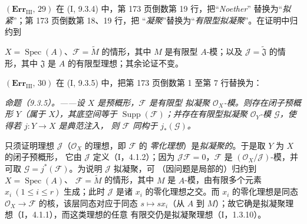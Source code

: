 \documentclass[UTF8,fontset=none,11pt,oneside,openany]{ctexbook}
\newcommand{\oldpage}[2][]{%
  \hypertarget{ega-source-page-#1-#2}{}%
  \marginnote{\scriptsize\textbf{#1}~|~#2}\ignorespaces}
\begin{document}
\noindent\textbf{$(\mathbf{Err}_{\mathrm{III}},\,29)$} 在
(I, 9.3.4) 中，第 173 页倒数第 19 行，把“\emph{Noether}”
替换为“\emph{拟紧}”；第 173 页倒数第 18、19 行，把
“\emph{凝聚}”替换为“\emph{有限型拟凝聚}”。在证明中归约到

\oldpage[III]{223}
$X=\operatorname{Spec}(A)$、$\mathscr F=\widetilde M$ 的情形，其中
$M$ 是有限型 $A$-模；以及 $\mathscr J=\widetilde{\mathfrak J}$
的情形，其中 $\mathfrak J$ 是 $A$ 的有限型理想；其余论证不变。

\noindent\textbf{$(\mathbf{Err}_{\mathrm{III}},\,30)$} 在
(I, 9.3.5) 中，把第 173 页倒数第 1 至第 7 行替换为：

\emph{命题（9.3.5）。——设 $X$ 是预概形，$\mathscr F$ 是有限型
拟凝聚 $\mathscr O_X$-模。则存在闭子预概形 $Y$（属于 $X$），其底空间等于
$\operatorname{Supp}(\mathscr F)$；并存在有限型拟凝聚
$\mathscr O_Y$-模 $\mathscr G$，使得若 $j:Y\to X$ 是典范注入，
则 $\mathscr F$ 同构于 $j_*(\mathscr G)$。}

只须证明理想 $\mathscr J$（$\mathscr O_X$ 的理想，即 $\mathscr F$ 的
\emph{零化理想}）是\emph{拟凝聚的}。于是取 $Y$ 为 $X$ 的闭子预概形，
它由 $\mathscr J$ 定义（I，4.1.2）；因为
$\mathscr J\mathscr F=0$，$\mathscr F$ 是
$(\mathscr O_X/\mathscr J)$-模，并可取
$\mathscr G=j^*(\mathscr F)$。为说明 $\mathscr J$ 拟凝聚，可
（因问题是局部的）归约到 $X=\operatorname{Spec}(A)$、
$\mathscr F=\widetilde M$ 的情形，其中 $M$ 是 $A$-模，由有限多个元素
$x_i\ (1\leq i\leq r)$ 生成；此时 $\mathscr J$ 是诸
$x_i$ 的零化理想之交。而 $x_i$ 的零化理想是同态
$\mathscr O_X\to\mathscr F$ 的核，该层同态对应于同态
$s\mapsto sx_i$（从 $A$ 到 $M$）；故它确是拟凝聚理想（I，4.1.1），而这类理想的任意
有限交仍是拟凝聚理想（I，1.3.10）。
\end{document}
